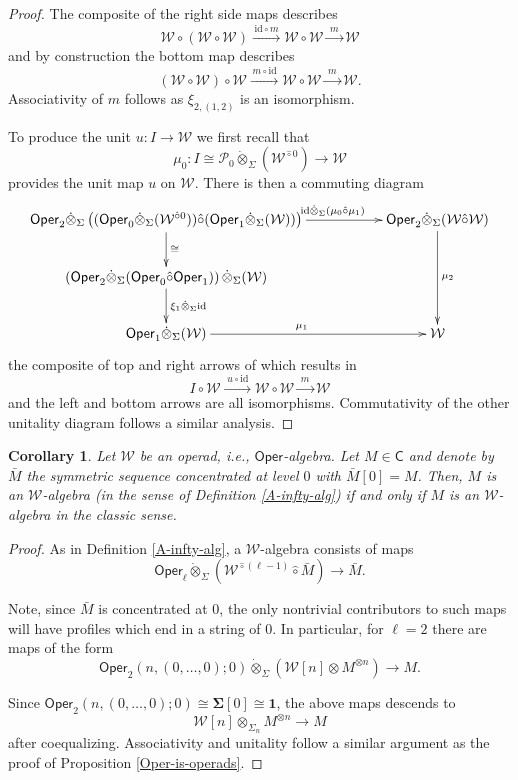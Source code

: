 \documentclass[11pt]{amsart}
\newtheorem{corollary}[subsection]{Corollary}
\theoremstyle{definition}
\theoremstyle{remark}
\newcommand{\Oper}{\mathsf{Oper}}
\newcommand{\id}{\mathrm{id}}
\newcommand{\Cal}[1]{\mathcal{#1}}
\newcommand{\circhat}{\hat{\circ}}
\newcommand{\tensordot}{\dot{\otimes}}
\begin{document}
\begin{proof}
The composite of the right side maps describes \[\Cal{W}\circ (\Cal{W}\circ \Cal{W})\xrightarrow{\, \id\circ m\,} \Cal{W}\circ \Cal{W} \xrightarrow{\; m\;} \Cal{W}\] and by construction the bottom map describes \[(\Cal{W}\circ \Cal{W})\circ \Cal{W} \xrightarrow{\, m\circ \id\,} \Cal{W}\circ \Cal{W} \xrightarrow{\; m\;} \Cal{W}.\] Associativity of $m$ follows as $\xi_{2,(1,2)}$ is an isomorphism. 

To produce the unit $u\colon I\to \Cal{W}$ we first recall that \[\mu_0\colon I\cong \Cal{P}_0\tensordot_{\Sigma}  (\Cal{W}^{\circhat 0}) \to \Cal{W}\] provides the unit map $u$ on $\Cal{W}$. There is then a commuting diagram \begin{equation*}
        \xymatrix{
            \Oper_2 \tensordot_{\Sigma}  \left( (\Oper_0\tensordot_{\Sigma}  (\Cal{W}^{\circhat 0})) \circhat (\Oper_1\tensordot_{\Sigma}  (\Cal{W})) \right) \ar[rr]^<(.2){\id\tensordot_{\Sigma} (\mu_0 \circhat \mu_1)} \ar[d]^{\cong}
            &&
            \Oper_2\tensordot_{\Sigma}  (\Cal{W} \circhat \Cal{W}) \ar[dd]^{\mu_2}
            \\
            \left( \Oper_2 \tensordot_{\Sigma}  (\Oper_0\circhat \Oper_1) \right) \tensordot_{\Sigma}  (\Cal{W}) \ar[d]^{\xi_1\tensordot_{\Sigma} \id}
            &&
            \\
            \Oper_1 \tensordot_{\Sigma} ( \Cal{W}) \ar[rr]^{\mu_1}
            &&
            \Cal{W}}
    \end{equation*} the composite of top and right arrows of which results in \[I\circ \Cal{W}\xrightarrow{\;u \circ \id\;} \Cal{W}\circ \Cal{W} \xrightarrow{\;m\;} \Cal{W}\] and the left and bottom arrows are all isomorphisms. Commutativity of the other unitality diagram follows a similar analysis.
\end{proof} 

\begin{corollary}
\label{oper-oper}
    Let $\Cal{W}$ be an operad, i.e., $\Oper$-algebra. Let $M\in \mathsf{C}$ and denote by $\bar{M}$ the symmetric sequence concentrated at level $0$ with $\bar{M}[0]=M$. Then, $M$ is an $\Cal{W}$-algebra (in the sense of Definition \ref{A-infty-alg}) if and only if $M$ is an $\Cal{W}$-algebra in the classic sense. 
\end{corollary}

\begin{proof}
    As in Definition \ref{A-infty-alg}, a $\Cal{W}$-algebra consists of maps \[\Oper_{\ell} \tensordot_{\Sigma}  (\Cal{W}^{\circhat (\ell-1)} \circhat \bar{M})\to \bar{M}.\] 
    
    Note, since $\bar{M}$ is concentrated at $0$, the only nontrivial contributors to such maps will have profiles which end in a string of $0$. In particular, for $\ell=2$ there are maps of the form \[\Oper_2(n,(0,\dots,0);0)\tensordot_{\Sigma}  \left( \Cal{W}[n] \otimes M^{\otimes n}\right)\to M.\] 
    
    Since $\Oper_2(n,(0,\dots,0);0)\cong \mathbf{\Sigma}[0]\cong \mathbf{1}$, the above maps descends to \[\Cal{W}[n]\otimes_{\Sigma_n} M^{\otimes n} \to M\] after coequalizing. Associativity and unitality follow a similar argument as the proof of Proposition \ref{Oper-is-operads}.
\end{proof}
\end{document}
